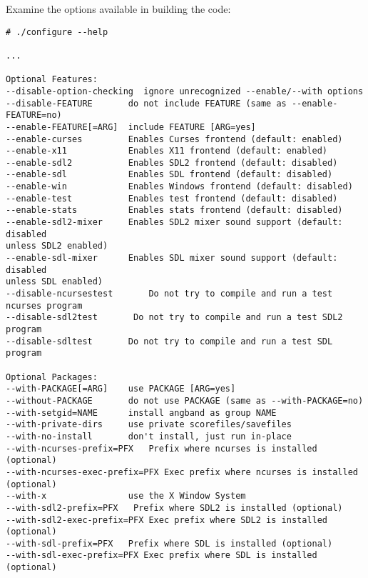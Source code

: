 \vspace{0.5cm}


\vspace{0.5cm}
Examine the options available in building the code:

\begin{verbatim}
# ./configure --help 

...

Optional Features:
--disable-option-checking  ignore unrecognized --enable/--with options
--disable-FEATURE       do not include FEATURE (same as --enable-FEATURE=no)
--enable-FEATURE[=ARG]  include FEATURE [ARG=yes]
--enable-curses         Enables Curses frontend (default: enabled)
--enable-x11            Enables X11 frontend (default: enabled)
--enable-sdl2           Enables SDL2 frontend (default: disabled)
--enable-sdl            Enables SDL frontend (default: disabled)
--enable-win            Enables Windows frontend (default: disabled)
--enable-test           Enables test frontend (default: disabled)
--enable-stats          Enables stats frontend (default: disabled)
--enable-sdl2-mixer     Enables SDL2 mixer sound support (default: disabled
unless SDL2 enabled)
--enable-sdl-mixer      Enables SDL mixer sound support (default: disabled
unless SDL enabled)
--disable-ncursestest       Do not try to compile and run a test ncurses program
--disable-sdl2test       Do not try to compile and run a test SDL2 program
--disable-sdltest       Do not try to compile and run a test SDL program

Optional Packages:
--with-PACKAGE[=ARG]    use PACKAGE [ARG=yes]
--without-PACKAGE       do not use PACKAGE (same as --with-PACKAGE=no)
--with-setgid=NAME      install angband as group NAME
--with-private-dirs     use private scorefiles/savefiles
--with-no-install       don't install, just run in-place
--with-ncurses-prefix=PFX   Prefix where ncurses is installed (optional)
--with-ncurses-exec-prefix=PFX Exec prefix where ncurses is installed (optional)
--with-x                use the X Window System
--with-sdl2-prefix=PFX   Prefix where SDL2 is installed (optional)
--with-sdl2-exec-prefix=PFX Exec prefix where SDL2 is installed (optional)
--with-sdl-prefix=PFX   Prefix where SDL is installed (optional)
--with-sdl-exec-prefix=PFX Exec prefix where SDL is installed (optional)

\end{verbatim}


